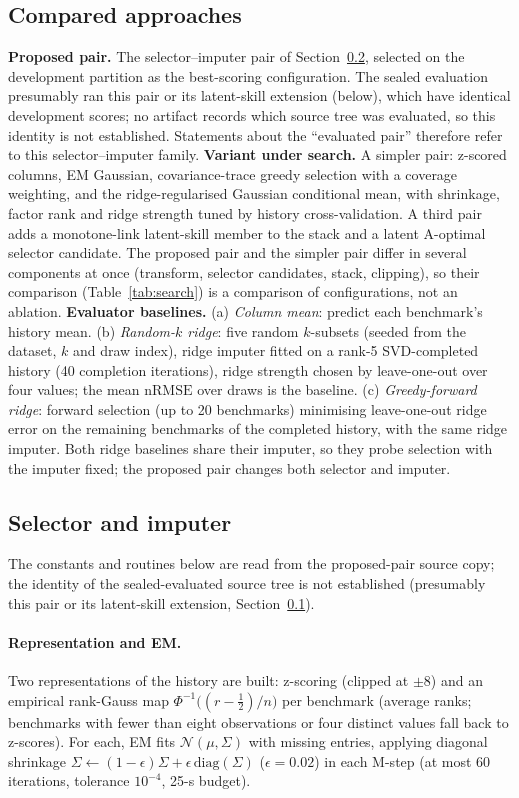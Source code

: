 \documentclass{article}
\newcommand{\nrmse}{\mathrm{nRMSE}}
\begin{document}
\subsection{Compared approaches}\label{sec:variants}
\textbf{Proposed pair.} The selector--imputer pair of Section~\ref{sec:impl}, selected on the development partition as the best-scoring configuration. The sealed evaluation presumably ran this pair or its latent-skill extension (below), which have identical development scores; no artifact records which source tree was evaluated, so this identity is not established. Statements about the ``evaluated pair'' therefore refer to this selector--imputer family. \textbf{Variant under search.} A simpler pair: z-scored columns, EM Gaussian, covariance-trace greedy selection with a coverage weighting, and the ridge-regularised Gaussian conditional mean, with shrinkage, factor rank and ridge strength tuned by history cross-validation. A third pair adds a monotone-link latent-skill member to the stack and a latent A-optimal selector candidate. The proposed pair and the simpler pair differ in several components at once (transform, selector candidates, stack, clipping), so their comparison (Table~\ref{tab:search}) is a comparison of configurations, not an ablation. \textbf{Evaluator baselines.} (a) \emph{Column mean}: predict each benchmark's history mean. (b) \emph{Random-$k$ ridge}: five random $k$-subsets (seeded from the dataset, $k$ and draw index), ridge imputer fitted on a rank-5 SVD-completed history (40 completion iterations), ridge strength chosen by leave-one-out over four values; the mean $\nrmse$ over draws is the baseline. (c) \emph{Greedy-forward ridge}: forward selection (up to 20 benchmarks) minimising leave-one-out ridge error on the remaining benchmarks of the completed history, with the same ridge imputer. Both ridge baselines share their imputer, so they probe selection with the imputer fixed; the proposed pair changes both selector and imputer.

\subsection{Selector and imputer}\label{sec:impl}
The constants and routines below are read from the proposed-pair source copy; the identity of the sealed-evaluated source tree is not established (presumably this pair or its latent-skill extension, Section~\ref{sec:variants}).

\paragraph{Representation and EM.} Two representations of the history are built: z-scoring (clipped at $\pm8$) and an empirical rank-Gauss map $\Phi^{-1}\big((r-\tfrac12)/n\big)$ per benchmark (average ranks; benchmarks with fewer than eight observations or four distinct values fall back to z-scores). For each, EM fits $\mathcal{N}(\mu,\Sigma)$ with missing entries, applying diagonal shrinkage $\Sigma\leftarrow(1-\epsilon)\Sigma+\epsilon\,\mathrm{diag}(\Sigma)$ ($\epsilon=0.02$) in each M-step (at most 60 iterations, tolerance $10^{-4}$, 25-s budget).
\end{document}
